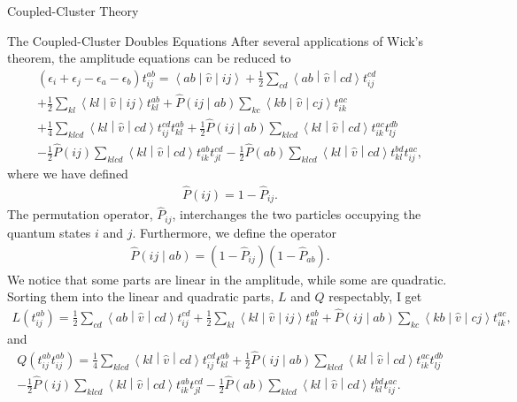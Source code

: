 \documentclass[twoside,english]{uiofysmaster}
\begin{document}
\begin{chapter}{Coupled-Cluster Theory}
\begin{section}{The Coupled-Cluster Doubles Equations}
  		After several applications of Wick's theorem, the amplitude equations can be reduced to 
  		\begin{align}
  			(\epsilon_i + \epsilon_j - \epsilon_a - \epsilon_b) t_{ij}^{ab} = \left<ab\middle|\hat v\middle|ij\right> + \frac{1}{2} \sum_{cd}\left<ab\middle|\hat v\middle|cd\right>t_{ij}^{cd} \\
  			+ \frac{1}{2} \sum_{kl} \left<kl\middle|\hat v\middle|ij\right>t_{kl}^{ab} + \hat P\left(ij\middle|ab\right) \sum_{kc}\left<kb\middle|\hat v\middle|cj\right>t_{ik}^{ac} \nonumber \\
  			+ \frac{1}{4} \sum_{klcd}\left<kl\middle|\hat v\middle|cd\right>t_{ij}^{cd} t_{kl}^{ab} + \frac{1}{2} \hat P\left(ij\middle|ab\right) \sum_{klcd}\left<kl\middle|\hat v\middle|cd\right>t_{ik}^{ac} t_{lj}^{db} \nonumber\\
  			- \frac{1}{2}\hat P(ij) \sum_{klcd}\left<kl\middle|\hat v\middle|cd\right>t_{ik}^{ab} t_{jl}^{cd} - \frac{1}{2}\hat P(ab) \sum_{klcd}\left<kl\middle|\hat v\middle|cd\right>t_{kl}^{bd} t_{ij}^{ac}\nonumber,
  			\label{CCD_equations1}
  		\end{align}
  		where we have defined
  		\begin{align}
  			\hat P(ij) = 1 - \hat P_{ij}. 
  		\end{align}
  		The permutation operator, $\hat P_{ij}$, interchanges the two particles occupying the quantum states $i$ and $j$. Furthermore, we define the operator 
  		\begin{align}
  			\hat P\left( ij \middle| ab \right) = (1 - \hat P_{ij}) (1 - \hat P_{ab}).
  		\end{align}
  		We notice that some parts are linear in the amplitude, while some are quadratic. Sorting them into the linear and quadratic parts, $L$ and $Q$ respectably, I get
  		\begin{align}
  			L(t_{ij}^{ab}) = \frac{1}{2} \sum_{cd}\left<ab\middle|\hat v\middle|cd\right>t_{ij}^{cd} + \frac{1}{2} \sum_{kl} \left<kl\middle|\hat v\middle|ij\right>t_{kl}^{ab} + \hat P\left(ij\middle|ab\right) \sum_{kc}\left<kb\middle|\hat v\middle|cj\right>t_{ik}^{ac}, 
  		\end{align}
  		and 
  		\begin{align}
  			Q(t_{ij}^{ab}t_{ij}^{ab}) = \frac{1}{4} \sum_{klcd}\left<kl\middle|\hat v\middle|cd\right>t_{ij}^{cd} t_{kl}^{ab} + \frac{1}{2} \hat P\left(ij\middle|ab\right) \sum_{klcd}\left<kl\middle|\hat v\middle|cd\right>t_{ik}^{ac} t_{lj}^{db} \\
  			- \frac{1}{2}\hat P(ij) \sum_{klcd}\left<kl\middle|\hat v\middle|cd\right>t_{ik}^{ab} t_{jl}^{cd} - \frac{1}{2}\hat P(ab) \sum_{klcd}\left<kl\middle|\hat v\middle|cd\right>t_{kl}^{bd} t_{ij}^{ac}. \nonumber

\end{align}
\end{section}
\end{chapter}
\end{document}
